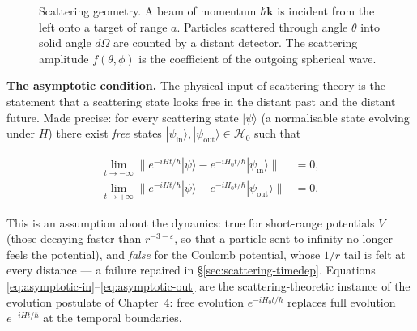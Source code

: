\begin{figure}[htbp!]
\centering
{}
\caption{Scattering geometry. A beam of momentum $\hbar\bm k$ is incident from the left onto a target of range $a$. Particles scattered through angle $\theta$ into solid angle $d\Omega$ are counted by a distant detector. The scattering amplitude $f(\theta,\phi)$ is the coefficient of the outgoing spherical wave.}
\label{fig:scattering-geometry}
\end{figure}

\medskip\noindent\textbf{The asymptotic condition.} The physical input of scattering theory is the statement that a scattering state looks free in the distant past and the distant future. Made precise: for every scattering state $|\psi\rangle$ (a normalisable state evolving under $H$) there exist \emph{free} states $|\psi_{\mathrm{in}}\rangle,|\psi_{\mathrm{out}}\rangle\in\mathcal{H}_{0}$ such that
\begin{linenomath}
\begin{align}
\lim_{t\to-\infty}\bigl\|e^{-iHt/\hbar}|\psi\rangle - e^{-iH_{0}t/\hbar}|\psi_{\mathrm{in}}\rangle\bigr\| &= 0,
\label{eq:asymptotic-in}\\
\lim_{t\to+\infty}\bigl\|e^{-iHt/\hbar}|\psi\rangle - e^{-iH_{0}t/\hbar}|\psi_{\mathrm{out}}\rangle\bigr\| &= 0.
\label{eq:asymptotic-out}
\end{align}
\end{linenomath}
This is an assumption about the dynamics: true for short-range potentials $V$ (those decaying faster than $r^{-3-\varepsilon}$, so that a particle sent to infinity no longer feels the potential), and \emph{false} for the Coulomb potential, whose $1/r$ tail is felt at every distance --- a failure repaired in \S\ref{sec:scattering-timedep}. Equations \eqref{eq:asymptotic-in}--\eqref{eq:asymptotic-out} are the scattering-theoretic instance of the evolution postulate of Chapter~4: free evolution $e^{-iH_{0}t/\hbar}$ replaces full evolution $e^{-iHt/\hbar}$ at the temporal boundaries.

